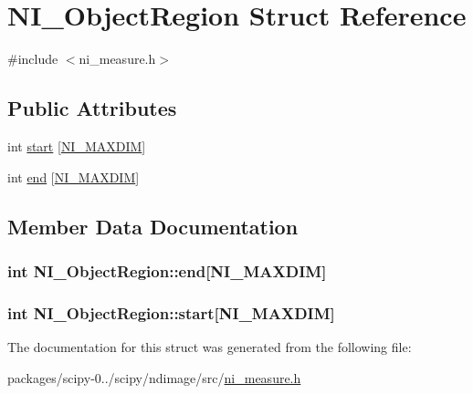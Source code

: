 \hypertarget{structNI__ObjectRegion}{}\section{N\+I\+\_\+\+Object\+Region Struct Reference}
\label{structNI__ObjectRegion}


{\ttfamily \#include $<$ni\+\_\+measure.\+h$>$}

\subsection*{Public Attributes}
\begin{DoxyCompactItemize}
\item 
int \hyperlink{structNI__ObjectRegion_aa0ab2d96ac276102080777d368f5662d}{start} \mbox{[}\hyperlink{nd__image_8h_adebb579485c7f8a430dde2d5b2f077e4}{N\+I\+\_\+\+M\+A\+X\+D\+I\+M}\mbox{]}
\item 
int \hyperlink{structNI__ObjectRegion_a43dbcf4479057fab283301e8ba11d3eb}{end} \mbox{[}\hyperlink{nd__image_8h_adebb579485c7f8a430dde2d5b2f077e4}{N\+I\+\_\+\+M\+A\+X\+D\+I\+M}\mbox{]}
\end{DoxyCompactItemize}


\subsection{Member Data Documentation}
\hypertarget{structNI__ObjectRegion_a43dbcf4479057fab283301e8ba11d3eb}{}
\subsubsection[{end}]{\setlength{\rightskip}{0pt plus 5cm}int N\+I\+\_\+\+Object\+Region\+::end\mbox{[}{\bf N\+I\+\_\+\+M\+A\+X\+D\+I\+M}\mbox{]}}\label{structNI__ObjectRegion_a43dbcf4479057fab283301e8ba11d3eb}
\hypertarget{structNI__ObjectRegion_aa0ab2d96ac276102080777d368f5662d}{}
\subsubsection[{start}]{\setlength{\rightskip}{0pt plus 5cm}int N\+I\+\_\+\+Object\+Region\+::start\mbox{[}{\bf N\+I\+\_\+\+M\+A\+X\+D\+I\+M}\mbox{]}}\label{structNI__ObjectRegion_aa0ab2d96ac276102080777d368f5662d}


The documentation for this struct was generated from the following file\+:\begin{DoxyCompactItemize}
\item 
packages/scipy-\/0../scipy/ndimage/src/\hyperlink{ni__measure_8h}{ni\+\_\+measure.\+h}\end{DoxyCompactItemize}

